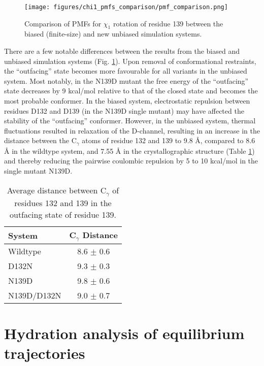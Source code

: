 \begin{figure}[htbp]
\centering
\texttt{[image: figures/chi1\_pmfs\_comparison/pmf\_comparison.png]}
\caption{Comparison of PMFs for $\chi_1$ rotation of residue 139 between the biased (finite-size) and new unbiased simulation systems.}
\label{fig:pmf_chi1_comparison}
\end{figure}

There are a few notable differences between the results from the biased and unbiased simulation systems (Fig. \ref{fig:pmf_chi1_comparison}). Upon removal of conformational restraints, the ``outfacing'' state becomes more favourable for all variants in the unbiased system. Most notably, in the N139D mutant the free energy of the ``outfacing'' state decreases by 9 kcal/mol relative to that of the closed state and becomes the most probable conformer. In the biased system, electrostatic repulsion between residues D132 and D139 (in the N139D single mutant) may have affected the stability of the ``outfacing'' conformer. However, in the unbiased system, thermal fluctuations resulted in relaxation of the D-channel, resulting in an increase in the distance between the C$_{\gamma}$ atoms of residue 132 and 139 to 9.8 Å, compared to 8.6 Å in the wildtype system, and 7.55 Å in the crystallographic structure (Table \ref{tbl:gamma_distances}) and thereby reducing the pairwise coulombic repulsion by 5 to 10 kcal/mol in the single mutant N139D.

\begin{table}
    \begin{center}
    \begin{singlespaced}
    \caption{Average distance between C$_{\gamma}$ of residues 132 and 139 in the outfacing state of residue 139.}
    \vspace{10pt}
    \label{tbl:gamma_distances}
    \begin{tabular}{lc}
    System  & C$_{\gamma}$ Distance \\
    \hline
    Wildtype & 8.6 $\pm$ 0.6 \\
    D132N & 9.3 $\pm$ 0.3 \\
    N139D & 9.8 $\pm$ 0.6 \\
    N139D/D132N & 9.0 $\pm$ 0.7 \\
    \hline
    \end{tabular}
    \end{singlespaced}
    \end{center}
\end{table}

\section{Hydration analysis of equilibrium trajectories}
\label{sec:results-hydration}

